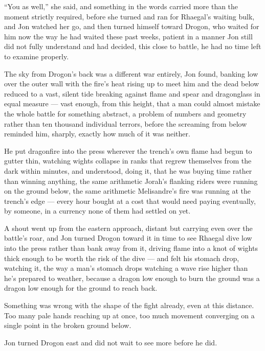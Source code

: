 “You as well,” she said, and something in the words carried more than the moment strictly required, before she turned and ran for Rhaegal’s waiting bulk, and Jon watched her go, and then turned himself toward Drogon, who waited for him now the way he had waited these past weeks, patient in a manner Jon still did not fully understand and had decided, this close to battle, he had no time left to examine properly.

\sceneBreak

The sky from Drogon’s back was a different war entirely, Jon found, banking low over the outer wall with the fire’s heat rising up to meet him and the dead below reduced to a vast, silent tide breaking against flame and spear and dragonglass in equal measure — vast enough, from this height, that a man could almost mistake the whole battle for something abstract, a problem of numbers and geometry rather than ten thousand individual terrors, before the screaming from below reminded him, sharply, exactly how much of it was neither.

He put dragonfire into the press wherever the trench’s own flame had begun to gutter thin, watching wights collapse in ranks that regrew themselves from the dark within minutes, and understood, doing it, that he was buying time rather than winning anything, the same arithmetic Jorah’s flanking riders were running on the ground below, the same arithmetic Melisandre’s fire was running at the trench’s edge — every hour bought at a cost that would need paying eventually, by someone, in a currency none of them had settled on yet.

A shout went up from the eastern approach, distant but carrying even over the battle’s roar, and Jon turned Drogon toward it in time to see Rhaegal dive low into the press rather than bank away from it, driving flame into a knot of wights thick enough to be worth the risk of the dive — and felt his stomach drop, watching it, the way a man’s stomach drops watching a wave rise higher than he’s prepared to weather, because a dragon low enough to burn the ground was a dragon low enough for the ground to reach back.

Something was wrong with the shape of the fight already, even at this distance. Too many pale hands reaching up at once, too much movement converging on a single point in the broken ground below.

Jon turned Drogon east and did not wait to see more before he did.